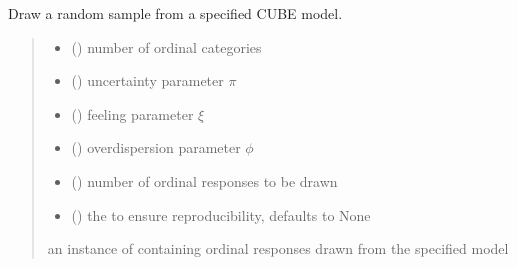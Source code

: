 \documentclass[letterpaper,10pt,english]{sphinxmanual}
\begin{document}
\begin{fulllineitems}
\label{\detokenize{cubmods:cubmods.cube.draw}}
\pysigstartsignatures
{}
\pysigstopsignatures
\sphinxAtStartPar
Draw a random sample from a specified CUBE model.
\begin{quote}\begin{description}
\begin{itemize}
\item {} 
\sphinxAtStartPar
{} () \textendash{} number of ordinal categories

\item {} 
\sphinxAtStartPar
{} () \textendash{} uncertainty parameter \(\pi\)

\item {} 
\sphinxAtStartPar
{} () \textendash{} feeling parameter \(\xi\)

\item {} 
\sphinxAtStartPar
{} () \textendash{} overdispersion parameter \(\phi\)

\item {} 
\sphinxAtStartPar
{} () \textendash{} number of ordinal responses to be drawn

\item {} 
\sphinxAtStartPar
{} (\sphinxstyleliteralemphasis{\sphinxupquote{, }}) \textendash{} the  to ensure reproducibility, defaults to None

\end{itemize}

\sphinxAtStartPar
an instance of  containing ordinal responses drawn from the specified model

\end{description}\end{quote}

\end{fulllineitems}
\end{document}
